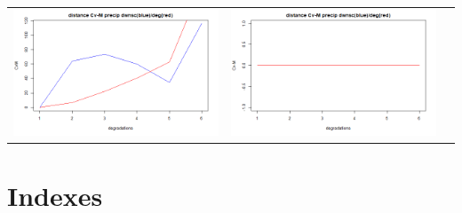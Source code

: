 \documentclass[a4paper,10pt]{article}
\begin{document}
\vspace{0.5 cm}

\hspace{-1cm}
\begin{tabular}{ccc}
	\includegraphics[scale=0.4]{images/Dist_CVM_precip.png} & \includegraphics[scale=0.4]{images/Dist_CVM_evap.png}  \\
\end{tabular} 



\section{Indexes}
\end{document}
